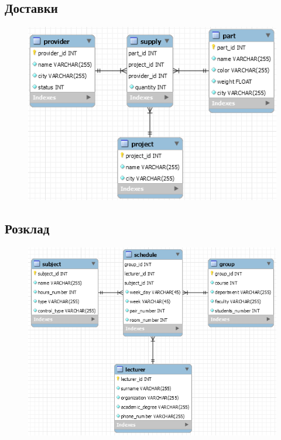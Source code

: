     \subsection{Доставки}
        \begin{figure}[H]
            \centering
            \includegraphics{supply.png}
            \label{fig:supply}
        \end{figure}
    \subsection{Розклад}
        \begin{figure}[H]
            \centering
            \includegraphics{schedule.png}
            \label{fig:schedule}
        \end{figure}


